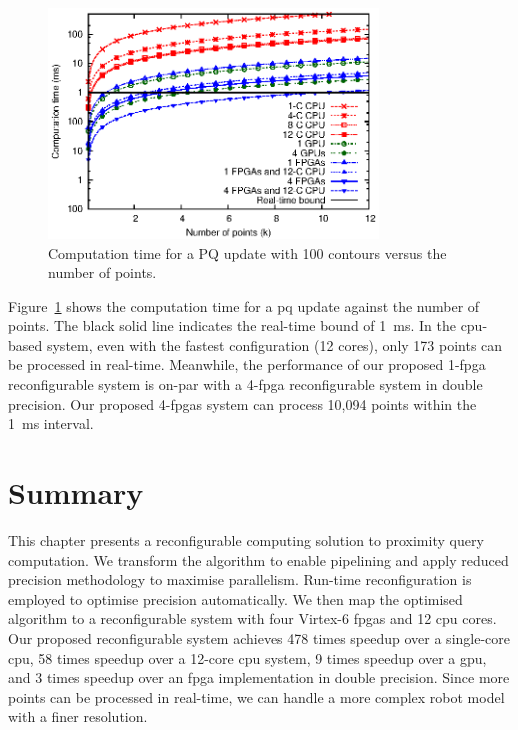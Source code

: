 \begin{figure}[ht]
\begin{center}
\includegraphics[width=0.78\textwidth]{3_precision/figures/fig_scalability}
\end{center}
\caption{Computation time for a PQ update with 100 contours versus the number of points.}
\label{fig:scalability}
\end{figure}

Figure~\ref{fig:scalability} shows the computation time for a \gls{pq} update against the number of points.
The black solid line indicates the real-time bound of 1~ms.
In the \gls{cpu}-based system, even with the fastest configuration (12 cores), only 173 points can be processed in real-time.
Meanwhile, the performance of our proposed 1-\gls{fpga} reconfigurable system is on-par with a 4-\gls{fpga} reconfigurable system in double precision.
Our proposed 4-\gls{fpga}s system can process 10,094 points within the 1~ms interval.


\section{Summary}
\label{sec:precision_summary}

This chapter presents a reconfigurable computing solution to proximity query computation.
We transform the algorithm to enable pipelining and apply reduced precision methodology to maximise parallelism.
Run-time reconfiguration is employed to optimise precision automatically.
We then map the optimised algorithm to a reconfigurable system with four Virtex-6 \gls{fpga}s and 12 \gls{cpu} cores.
Our proposed reconfigurable system achieves 478 times speedup over a single-core \gls{cpu}, 58 times speedup over a 12-core \gls{cpu} system, 9 times speedup over a \gls{gpu}, and 3 times speedup over an \gls{fpga} implementation in double precision.
Since more points can be processed in real-time, we can handle a more complex robot model with a finer resolution.
